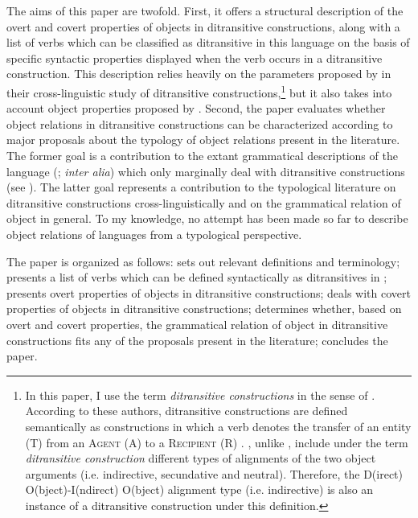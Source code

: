 \documentclass[output=paper]{langsci/langscibook}
\begin{document}
The aims of this paper are twofold. First, it offers a structural description of the overt and covert properties of objects in  ditransitive constructions, along with a list of verbs which can be classified as ditransitive in this language on the basis of specific syntactic properties displayed when the verb occurs in a ditransitive construction. This description relies heavily on the parameters proposed by \citet{malchukovetal2010} in their cross-linguistic study of ditransitive constructions,\footnote{In this paper, I use the term \textit{ditransitive constructions} in the sense of \citet{malchukovetal2010}. According to these authors, ditransitive constructions are defined semantically as constructions in which a verb denotes the transfer of an entity (T) from an \textsc{Agent} (A) to a \textsc{Recipient} (R) \citep[1]{malchukovetal2010}. \citet{malchukovetal2010}, unlike \citet{goldberg1995}, include under the term \textit{ditransitive construction} different types of alignments of the two object arguments (i.e. indirective, secundative and neutral). Therefore, the D(irect) O(bject)-I(ndirect) O(bject) alignment type (i.e. indirective) is also an instance of a ditransitive construction under this definition.} but it also takes into account object properties proposed by \citet{hymanduranti1982}. Second, the paper evaluates whether object relations in  ditransitive constructions can be characterized according to major proposals about the typology of object relations present in the literature. The former goal is a contribution to the extant grammatical descriptions of the language (\citealt{alexandre1953,canu1974,peterson1971,kouraogo1976,kabore1985}; \textit{inter alia}) which only marginally deal with ditransitive constructions (see \citealt{canu1974,kabore1985}). The latter goal represents a contribution to the typological literature on ditransitive constructions cross-linguistically and on the grammatical relation of object in general. To my knowledge, no attempt has been made so far to describe object relations of  languages from a typological perspective.  

The paper is organized as follows:  sets out relevant definitions and terminology;  presents a list of verbs which can be defined syntactically as ditransitives in ;  presents overt properties of objects in  ditransitive constructions;  deals with covert properties of objects in  ditransitive constructions;  determines whether, based on overt and covert properties, the grammatical relation of object in  ditransitive constructions fits any of the proposals present in the literature;  concludes the paper.    
\end{document}
